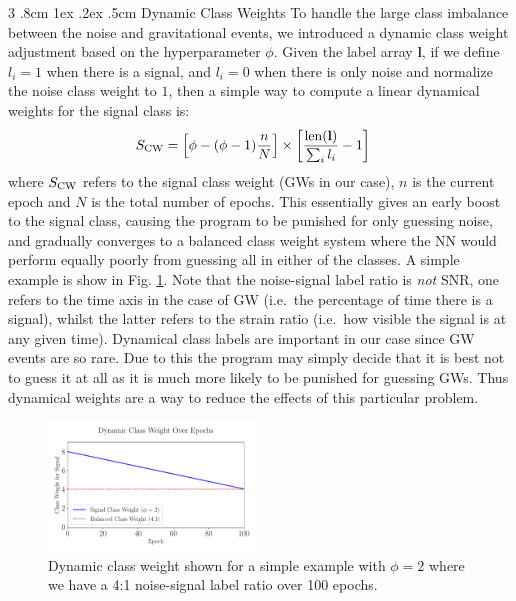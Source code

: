 \documentclass[%
reprint,
amsmath,amssymb,
aps,
]{revtex4-2}
\makeatletter
\renewcommand{\subsubsection}{%
	\@startsection
	{subsubsection}%
	{3}%
	{\z@}%
	{.8cm \@plus1ex \@minus .2ex}%
	{.5cm}%
	{\normalfont\small\centering}%
}
\makeatother
\begin{document}
\subsubsection{Dynamic Class Weights}
To handle the large class imbalance between the noise and gravitational events, we introduced a dynamic class weight adjustment based on the hyperparameter $\phi$. Given the label array $\textbf{l}$, if we define $l_i=1$ when there is a signal, and $l_i=0$ when there is only noise and normalize the noise class weight to $1$, then a simple way to compute a linear dynamical weights for the signal class is:
\begin{align}
	S_{\rm CW}&=\left[\phi-(\phi-1)\frac{n}{N}\right]\times\left[\frac{{\rm len}(\textbf{l})}{\sum_i l_i}-1\right]
\end{align}
where $S_{\rm CW}$ refers to the signal class weight (GWs in our case), $n$ is the current epoch and $N$ is the total number of epochs. This essentially gives an early boost to the signal class, causing the program to be punished for only guessing noise, and gradually converges to a balanced class weight system where the NN would perform equally poorly from guessing all in either of the classes. A simple example is show in Fig. \ref{fig:DynamicCW}. Note that the noise-signal label ratio is \textit{not} SNR, one refers to the time axis in the case of GW (i.e.~the percentage of time there is a signal), whilst the latter refers to the strain ratio (i.e.~how visible the signal is at any given time). Dynamical class labels are important in our case since GW events are so rare. Due to this the program may simply decide that it is best not to guess it at all as it is much more likely to be punished for guessing GWs. Thus dynamical weights are a way to reduce the effects of this particular problem.
\begin{figure}[ht!]
	\includegraphics[width=0.49\textwidth]{Figures/DynamicCW.pdf}
	\caption{Dynamic class weight shown for a simple example with $\phi=2$ where we have a 4:1 noise-signal label ratio over 100 epochs.}
	\label{fig:DynamicCW}
\end{figure}
\end{document}
